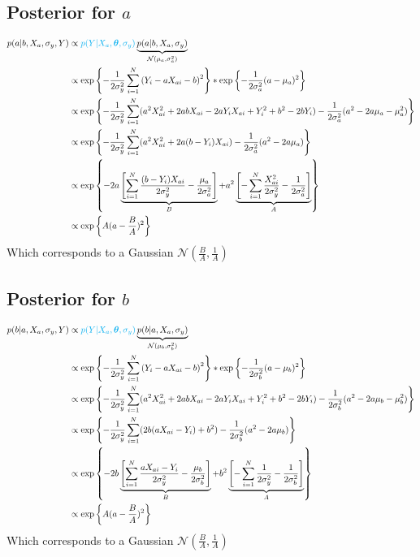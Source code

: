 \documentclass[10pt]{article}
\renewcommand{\vec}[1]{\boldsymbol{#1}}
\begin{document}
\subsection{Posterior for $a$}
\begin{align}
    p(a|b, X_a, \sigma_y, Y) &\propto {\color{cyan} p(Y | X_a, \vec{\theta}, \sigma_y)} \underbrace{p(a | b, X_a, \sigma_{y})}_{\mathcal{N}(\mu_a, \sigma_a^2)} \\
    &\propto \exp\left\{ - \frac{1}{2\sigma_y^2} \sum_{i=1}^N \left( Y_i - a X_{ai} - b \right)^2 \right\} * \exp\left\{ - \frac{1}{2\sigma_a^2} ( a - \mu_a )^2 \right\} \\
    &\propto \exp\left\{ - \frac{1}{2\sigma_y^2} \sum_{i=1}^N (a^2 X_{ai}^2  + 2 a b X_{ai} - 2 a Y_i X_{ai} + Y_i^2 + b^2 -2 b Y_i) - \frac{1}{2\sigma_a^2} ( a^2 - 2 a \mu_a - \mu_a^2 ) \right\} \\
    &\propto \exp\left\{ - \frac{1}{2\sigma_y^2} \sum_{i=1}^N (a^2 X_{ai}^2  + 2 a (b - Y_i) X_{ai} ) - \frac{1}{2\sigma_a^2} ( a^2 - 2 a \mu_a ) \right\} \\
    &\propto \exp\left\{ - 2 a \underbrace{\left[ \sum_{i=1}^N \frac{(b - Y_i) X_{ai}}{2\sigma_y^2} - \frac{\mu_a}{2\sigma_a^2} \right]}_{B} + a^2 \underbrace{\left[ - \sum_{i=1}^N \frac{X_{ai}^2}{2\sigma_y^2}  - \frac{1}{2\sigma_a^2} \right]}_{A} \right\} \\
    &\propto \exp\left\{ A (a - \frac{B}{A})^2\right\}
\end{align}
Which corresponds to a Gaussian $\mathcal{N}(\frac{B}{A}, \frac{1}{A})$


\subsection{Posterior for $b$}
\begin{align}
    p(b|a, X_a, \sigma_y, Y) &\propto {\color{cyan} p(Y | X_a, \vec{\theta}, \sigma_y)} \underbrace{p(b | a, X_a, \sigma_{y})}_{\mathcal{N}(\mu_b, \sigma_b^2)} \\
    &\propto \exp\left\{ - \frac{1}{2\sigma_y^2} \sum_{i=1}^N \left( Y_i - a X_{ai} - b \right)^2 \right\} * \exp\left\{ - \frac{1}{2\sigma_b^2} ( a - \mu_b )^2 \right\} \\
    &\propto \exp\left\{ - \frac{1}{2\sigma_y^2} \sum_{i=1}^N (a^2 X_{ai}^2  + 2 a b X_{ai} - 2 a Y_i X_{ai} + Y_i^2 + b^2 -2 b Y_i )- \frac{1}{2\sigma_b^2} ( a^2 - 2 a \mu_b - \mu_b^2 ) \right\} \\
    &\propto \exp\left\{ - \frac{1}{2\sigma_y^2} \sum_{i=1}^N (2 b (a X_{ai} - Y_i) + b^2 ) - \frac{1}{2\sigma_b^2} ( a^2 - 2 a \mu_b ) \right\} \\
    &\propto \exp\left\{ - 2 b \underbrace{\left[ \sum_{i=1}^N \frac{a X_{ai} - Y_i}{2\sigma_y^2} - \frac{\mu_b}{2\sigma_b^2} \right]}_{B} + b^2 \underbrace{\left[ - \sum_{i=1}^N \frac{1}{2\sigma_y^2}  - \frac{1}{2\sigma_b^2} \right]}_{A} \right\} \\
    &\propto \exp\left\{A (a - \frac{B}{A})^2\right\}
\end{align}
Which corresponds to a Gaussian $\mathcal{N}(\frac{B}{A}, \frac{1}{A})$
\end{document}
